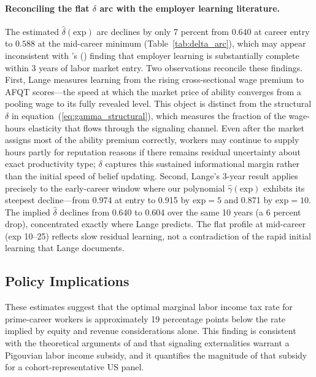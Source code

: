\documentclass[12pt]{article}
\theoremstyle{definition}
\theoremstyle{remark}
\newcommand{\citepos}[1]{\citeauthor{#1}'s (\citeyear{#1})}
\begin{document}
\paragraph{Reconciling the flat $\delta$ arc with the employer learning literature.}
The estimated $\hat{\delta}(\text{exp})$ arc declines by only 7 percent from $0.640$ at
career entry to $0.588$ at the mid-career minimum (Table~\ref{tab:delta_arc}), which may
appear inconsistent with \citepos{lange2007speed} finding that employer learning is
substantially complete within 3 years of labor market entry. Two observations reconcile
these findings. First, Lange measures learning from the rising cross-sectional wage premium
to AFQT scores—the speed at which the market price of ability converges from a pooling wage
to its fully revealed level. This object is distinct from the structural $\delta$ in
equation~(\ref{eq:gamma_structural}), which measures the fraction of the wage-hours elasticity
that flows through the signaling channel. Even after the market assigns most of the ability
premium correctly, workers may continue to supply hours partly for reputation reasons if
there remains residual uncertainty about exact productivity type; $\delta$ captures this
sustained informational margin rather than the initial speed of belief updating. Second,
Lange's 3-year result applies precisely to the early-career window where our polynomial
$\hat{\gamma}(\text{exp})$ exhibits its steepest decline---from 0.974 at entry to 0.915 by
$\text{exp} = 5$ and 0.871 by $\text{exp} = 10$. The implied $\hat{\delta}$ declines from
0.640 to 0.604 over the same 10 years (a 6 percent drop), concentrated exactly where Lange
predicts. The flat profile at mid-career (exp 10--25) reflects slow residual learning, not
a contradiction of the rapid initial learning that Lange documents.

\subsection{Policy Implications}

These estimates suggest that the optimal marginal labor income tax rate for prime-career
workers is approximately 19 percentage points below the rate implied by equity and revenue
considerations alone. This finding is consistent with the theoretical arguments of
\citet{boskin1975taxation} and \citet{sztutman2024} that signaling externalities warrant
a Pigouvian labor income subsidy, and it quantifies the magnitude of that subsidy for a
cohort-representative US panel.
\end{document}
